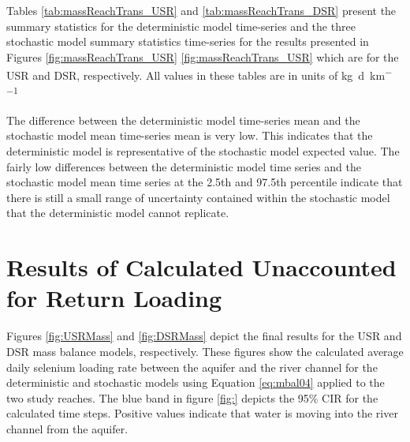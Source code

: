\begin{linenumbers}
Tables \ref{tab:massReachTrans_USR} and \ref{tab:massReachTrans_DSR} present the summary statistics for the deterministic model time-series and the three stochastic model summary statistics time-series for the results presented in Figures \ref{fig:massReachTrans_USR} \ref{fig:massReachTrans_USR} which are for the USR and DSR, respectively.  All values in these tables are in units of \si{\kilo\gram\per\day\per\kilo\meter}

\subtabletop
\begin{table}[htbp]
	\centering
	\caption[USR deterministic and stochastic dissolved selenium mass transport time-series results tables.]{USR deterministic and stochastic dissolved selenium mass transport time-series results tables.  Values are in units of \si{\kilo\gram\per\day\per\kilo\meter}.}
	\label{tab:massReachTrans_USR}
	
	\tablevspace
\end{table}
\begin{table}[htbp]
	\centering
	\caption[USR deterministic and stochastic dissolved selenium mass transport time-series results tables.]{USR deterministic and stochastic dissolved selenium mass transport time-series results tables.  Values are in units of \si{\kilo\gram\per\day\per\kilo\meter}.}
	\label{tab:massReachTrans_DSR}
	
\end{table}

The difference between the deterministic model time-series mean and the stochastic model mean time-series mean is very low.  This indicates that the deterministic model is representative of the stochastic model expected value.  The fairly low differences between the deterministic model time series and the stochastic model mean time series at the 2.5th and 97.5th percentile indicate that there is still a small range of uncertainty contained within the stochastic model that the deterministic model cannot replicate.
\clearpage{}


\section{Results of Calculated Unaccounted for Return Loading}
\label{sec:MassModelResults}


Figures \ref{fig:USRMass} and \ref{fig:DSRMass} depict the final results for the USR and DSR mass balance models, respectively.  These figures show the calculated average daily selenium loading rate between the aquifer and the river channel for the deterministic and stochastic models using Equation \ref{eq:mbal04} applied to the two study reaches.  The blue band in figure \ref{fig:} depicts the 95\% CIR for the calculated time steps.  Positive values indicate that water is moving into the river channel from the aquifer.


\end{linenumbers}
